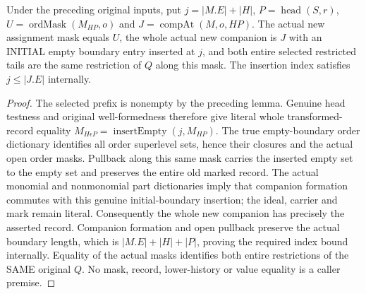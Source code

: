 \begin{lemma}
\label{hir:original-general-short-whole-companion-diagram}
\leanok
Under the preceding original inputs, put $j=|M.E|+|H|$, $P=\operatorname{head}(S,r)$,
$U=\operatorname{ordMask}(M_{HP},o)$ and $J=\operatorname{compAt}(M,o,HP)$.
The actual new assignment mask equals $U$, the whole actual new companion is
$J$ with an INITIAL empty boundary entry inserted at $j$, and both entire
selected restricted tails are the same restriction of $Q$ along this mask.
The insertion index satisfies $j\leq |J.E|$ internally.
\end{lemma}
\begin{proof}
The selected prefix is nonempty by the preceding lemma. Genuine head testness
and original well-formedness therefore give literal whole transformed-record
equality $M_{H\epsilon P}=\operatorname{insertEmpty}(j,M_{HP})$.
The true empty-boundary order dictionary identifies all order superlevel sets,
hence their closures and the actual open order masks. Pullback along this same
mask carries the inserted empty set to the empty set and preserves the entire
old marked record. The actual monomial and nonmonomial part dictionaries imply
that companion formation commutes with this genuine initial-boundary insertion;
the ideal, carrier and mark remain literal. Consequently the whole new
companion has precisely the asserted record. Companion formation and open
pullback preserve the actual boundary length, which is
$|M.E|+|H|+|P|$, proving the required index bound internally. Equality of the
actual masks identifies both entire restrictions of the SAME original $Q$.
No mask, record, lower-history or value equality is a caller premise.
\end{proof}

